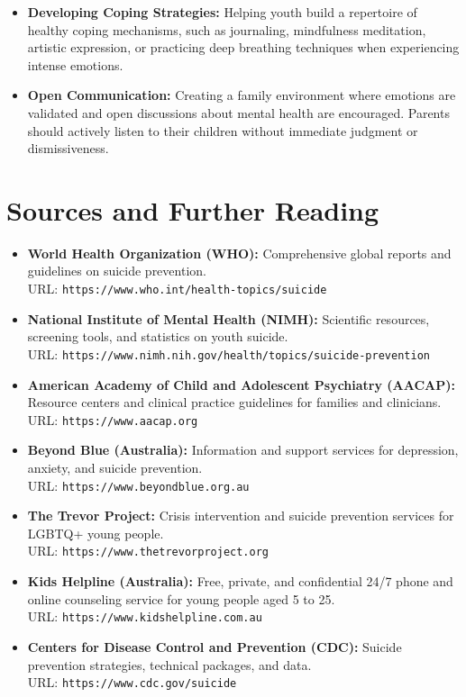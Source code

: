 \begin{itemize}
\begin{itemize}
    \end{itemize}
    \item \textbf{Developing Coping Strategies:} Helping youth build a repertoire of healthy coping mechanisms, such as journaling, mindfulness meditation, artistic expression, or practicing deep breathing techniques when experiencing intense emotions.
    \item \textbf{Open Communication:} Creating a family environment where emotions are validated and open discussions about mental health are encouraged. Parents should actively listen to their children without immediate judgment or dismissiveness.
\end{itemize}

\section*{Sources and Further Reading}
\begin{itemize}
    \item \textbf{World Health Organization (WHO):} Comprehensive global reports and guidelines on suicide prevention. \\ URL: \texttt{https://www.who.int/health-topics/suicide}
    \item \textbf{National Institute of Mental Health (NIMH):} Scientific resources, screening tools, and statistics on youth suicide. \\ URL: \texttt{https://www.nimh.nih.gov/health/topics/suicide-prevention}
    \item \textbf{American Academy of Child and Adolescent Psychiatry (AACAP):} Resource centers and clinical practice guidelines for families and clinicians. \\ URL: \texttt{https://www.aacap.org}
    \item \textbf{Beyond Blue (Australia):} Information and support services for depression, anxiety, and suicide prevention. \\ URL: \texttt{https://www.beyondblue.org.au}
    \item \textbf{The Trevor Project:} Crisis intervention and suicide prevention services for LGBTQ+ young people. \\ URL: \texttt{https://www.thetrevorproject.org}
    \item \textbf{Kids Helpline (Australia):} Free, private, and confidential 24/7 phone and online counseling service for young people aged 5 to 25. \\ URL: \texttt{https://www.kidshelpline.com.au}
    \item \textbf{Centers for Disease Control and Prevention (CDC):} Suicide prevention strategies, technical packages, and data. \\ URL: \texttt{https://www.cdc.gov/suicide}
\end{itemize}
